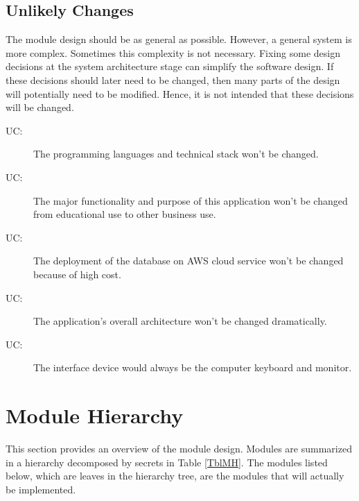 \documentclass[12pt, titlepage]{article}
\newcounter{ucnum}
\newcommand{\uctheucnum}{UC\theucnum}
\begin{document}
\subsection{Unlikely Changes} \label{SecUchange}

The module design should be as general as possible. However, a general system is
more complex. Sometimes this complexity is not necessary. Fixing some design
decisions at the system architecture stage can simplify the software design. If
these decisions should later need to be changed, then many parts of the design
will potentially need to be modified. Hence, it is not intended that these
decisions will be changed.

\begin{description}
\item[ \uctheucnum \label{ucIO}:] The programming languages and technical stack won't be changed.
\item[ \uctheucnum \label{ucIO}:] The major functionality and purpose of this application won't be changed from educational use to other business use.  
\item[ \uctheucnum \label{ucIO}:]
The deployment of the database on AWS cloud service won't be changed because of high cost.
\item[ \uctheucnum \label{ucIO}:] The application's overall architecture won't be changed dramatically.
\item[ \uctheucnum \label{ucIO}:]
The interface device would always be the computer keyboard and monitor.
\end{description}

\section{Module Hierarchy} \label{SecMH}

This section provides an overview of the module design. Modules are summarized
in a hierarchy decomposed by secrets in Table \ref{TblMH}. The modules listed
below, which are leaves in the hierarchy tree, are the modules that will
actually be implemented.
\end{document}
